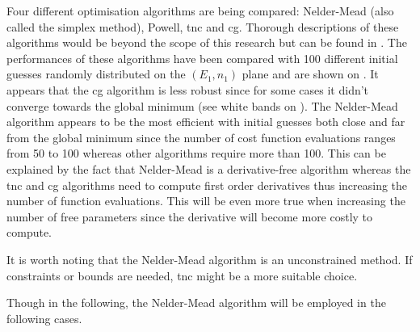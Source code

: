 Four different optimisation algorithms are being compared: 
Nelder-Mead (also called the simplex method), Powell, \gls{tnc} and \gls{cg}.
Thorough descriptions of these algorithms would be beyond the scope of this research but can be found in .
The performances of these algorithms have been compared with 100 different initial guesses randomly distributed on the $(E_1,n_1)$ plane and are shown on .
It appears that the \gls{cg} algorithm is less robust since for some cases it didn't converge towards the global minimum (see white bands on ).
The Nelder-Mead algorithm appears to be the most efficient with initial guesses both close and far from the global minimum since the number of cost function evaluations ranges from 50 to 100 whereas other algorithms require more than 100.
This can be explained by the fact that Nelder-Mead is a derivative-free algorithm whereas the \gls{tnc} and \gls{cg} algorithms need to compute first order derivatives thus increasing the number of function evaluations.
This will be even more true when increasing the number of free parameters since the derivative will become more costly to compute.

It is worth noting that the Nelder-Mead algorithm is an unconstrained method.
If constraints or bounds are needed, \gls{tnc} might be a more suitable choice.

Though in the following, the Nelder-Mead algorithm will be employed in the following cases.

